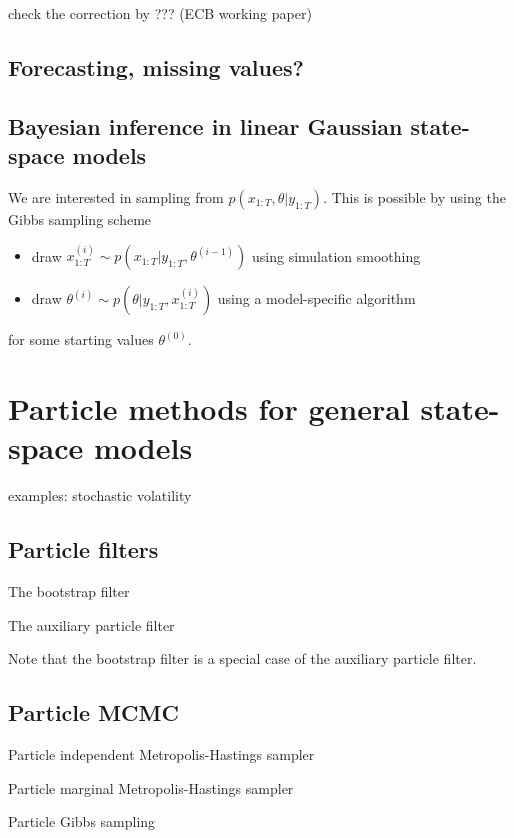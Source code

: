 \documentclass[12pt,a4paper]{scrartcl}
\begin{document}
check the correction by ??? (ECB working paper)

\subsection{Forecasting, missing values?}

\subsection{Bayesian inference in linear Gaussian state-space models}

We are interested in sampling from $p(x_{1:T}, \theta | y_{1:T})$. This is possible by using the Gibbs sampling scheme

\begin{itemize}
	\item draw $x_{1:T}^{(i)} \sim p(x_{1:T} | y_{1:T}, \theta^{(i-1)})$ using simulation smoothing
	\item draw $\theta^{(i)} \sim p(\theta | y_{1:T}, x_{1:T}^{(i)})$ using a model-specific algorithm
\end{itemize}

for some starting values $\theta^{(0)}$.

\section{Particle methods for general state-space models}

examples: stochastic volatility

\subsection{Particle filters}

The bootstrap filter \citep{GordonEtal1993}

The auxiliary particle filter \citep{PittShephard1999}

Note that the bootstrap filter is a special case of the auxiliary particle filter.

\subsection{Particle MCMC \citep{AndrieuEtal2010}}

Particle independent Metropolis-Hastings sampler

Particle marginal Metropolis-Hastings sampler

Particle Gibbs sampling
\end{document}
